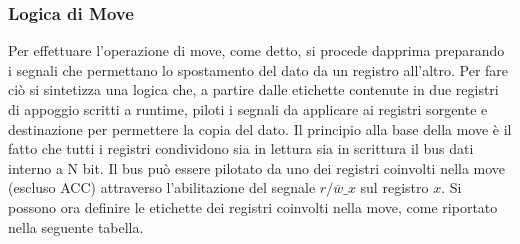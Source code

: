\subsubsection{Logica di Move}
Per effettuare l'operazione di move, come detto, si procede dapprima preparando i segnali che permettano lo spostamento del dato da un registro all'altro. Per fare ciò si sintetizza una logica che, a partire dalle etichette contenute in due registri di appoggio scritti a runtime, piloti i segnali da applicare ai registri sorgente e destinazione per permettere la copia del dato.
Il principio alla base della move è il fatto che tutti i registri condividono sia in lettura sia in scrittura il bus dati interno a N bit. Il bus può essere pilotato da uno dei registri coinvolti nella move (escluso ACC) attraverso l'abilitazione del segnale \textit{$r/\overline{w}\_x$} sul registro $x$. 
Si possono ora definire le etichette dei registri coinvolti nella move, come riportato nella seguente tabella.
